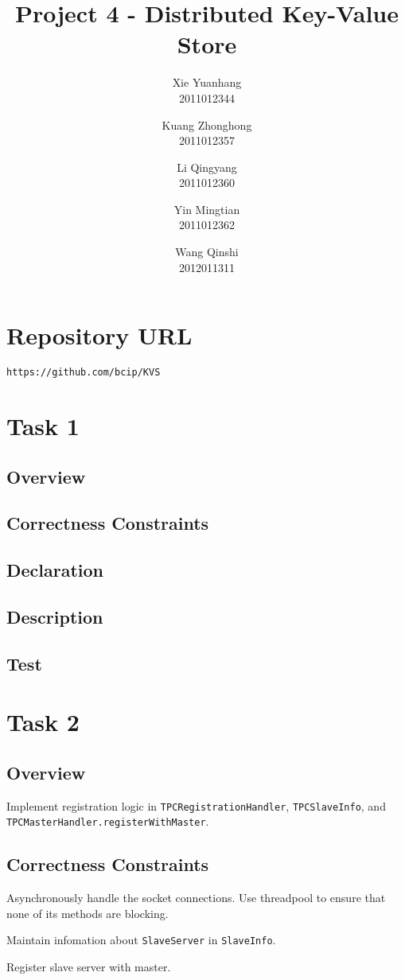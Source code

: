 \documentclass{article}
\title{Project 4 - Distributed Key-Value Store}
\author{
Xie Yuanhang  \\   2011012344\and
Kuang Zhonghong  \\   2011012357\and
Li Qingyang   \\   2011012360 \and
Yin Mingtian   \\   2011012362\and
Wang Qinshi   \\   2012011311}
\date{}
\begin{document}
\maketitle

\setcounter{section}{-1}
 \section{Repository URL}
\texttt{https://github.com/bcip/KVS}

\section{Task 1}
\subsection{Overview}
\subsection{Correctness Constraints}
\subsection{Declaration}
\subsection{Description}
\subsection{Test}

\section{Task 2}
\subsection{Overview}
Implement registration logic in \texttt{TPCRegistrationHandler}, \texttt{TPCSlaveInfo}, and 
\texttt{TPCMasterHandler.registerWithMaster}.
\subsection{Correctness Constraints}
\begin{compactitem}
	\item Asynchronously handle the socket connections. Use threadpool to ensure that none of its methods are
		blocking.
	\item Maintain infomation about \texttt{SlaveServer} in \texttt{SlaveInfo}.
	\item Register slave server with master. 
\end{compactitem}
\end{document}
